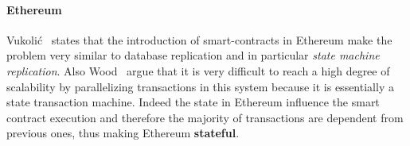 \paragraph{Ethereum} Vukoli\'c~\cite{bib:the-quest} states that the introduction
of smart-contracts in Ethereum make the problem very similar to database
replication and in particular \emph{state machine replication}. Also
Wood~\cite{wood2018ethereum} argue that it is very difficult to reach a high
degree of scalability by parallelizing transactions in this system because it is
essentially a state transaction machine. Indeed the state in Ethereum influence
the smart contract execution and therefore the majority of transactions are
dependent from previous ones, thus making Ethereum \textbf{stateful}.



